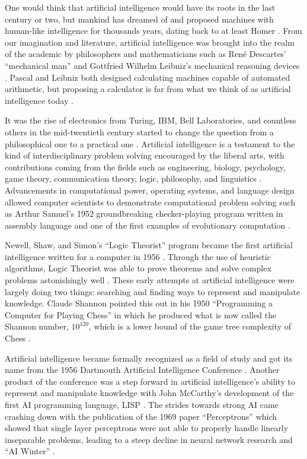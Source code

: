 \documentclass[oneside,12pt,openany]{book}
\begin{document}
	
	One would think that artificial intelligence would have its roots in the last century or two, but mankind has dreamed of and proposed machines with human-like intelligence for thousands years, dating back to at least Homer \cite{Buchanan}. From our imagination and literature, artificial intelligence was brought into the realm of the academic by philosophers and mathematicians such as Ren\'e Descartes' ``mechanical man'' and Gottfried Wilhelm Leibniz's mechanical reasoning devices \cite{Buchanan}. Pascal and Leibniz both designed calculating machines capable of automated arithmetic, but proposing a calculator is far from what we think of as artificial intelligence today \cite{Buchanan}.
	
	It was the rise of electronics from Turing, IBM, Bell Laboratories, and countless others in the mid-twentieth century started to change the question from a philosophical one to a practical one \cite{Buchanan}. Artificial intelligence is a testament to the kind of interdisciplinary problem solving encouraged by the liberal arts, with contributions coming from the fields such as engineering, biology, psychology, game theory, communication theory, logic, philosophy, and linguistics \cite{Buchanan}. Advancements in computational power, operating systems, and language design allowed computer scientists to demonstrate computational problem solving such as Arthur Samuel's 1952 groundbreaking checker-playing program written in assembly language and one of the first examples of evolutionary computation \cite{Buchanan}. 
	
	Newell, Shaw, and Simon's ``Logic Theorist'' program became the first artificial intelligence written for a computer in 1956 \cite{Gugerty}. Through the use of heuristic algorithms, Logic Theorist was able to prove theorems and solve complex problems astonishingly well \cite{Gugerty}. These early attempts at artificial intelligence were largely doing two things: searching and finding ways to represent and manipulate knowledge. Claude Shannon pointed this out in his 1950 ``Programming a Computer for Playing Chess'' in which he produced what is now called the Shannon number, $10^{120}$, which is a lower bound of the game tree complexity of Chess \cite{Jones}.
	
	Artificial intelligence became formally recognized as a field of study and got its name from the 1956 Dartmouth Artificial Intelligence Conference \cite{Buchanan}. Another product of the conference was a step forward in artificial intelligence's ability to represent and manipulate knowledge with John McCarthy's development of the first AI programming language, LISP \cite{Jones}. The strides towards strong AI came crashing down with the publication of the 1969 paper ``Perceptrons'' which showed that single layer perceptrons were not able to properly handle linearly inseparable problems, leading to a steep decline in neural network research and ``AI Winter'' \cite{Jones}.
	
\end{document}
